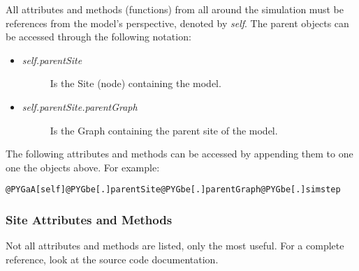 \documentclass[a4paper,10pt]{manual}
\begin{document}
All attributes and methods (functions) from all around the simulation must be references from the model's  perspective, denoted by \emph{self}. The parent objects can be accessed through the following notation:
\begin{itemize}
\item {} \begin{description}
\item[\emph{self.parentSite}]
Is the Site (node) containing the model.

\end{description}

\item {} \begin{description}
\item[\emph{self.parentSite.parentGraph}]
Is the Graph containing the parent site of the model.

\end{description}

\end{itemize}

The following attributes and methods can be accessed by appending them to one one the objects above. For example:

\begin{Verbatim}[commandchars=@\[\]]
@PYGaA[self]@PYGbe[.]parentSite@PYGbe[.]parentGraph@PYGbe[.]simstep
\end{Verbatim}


\subsubsection{Site Attributes and Methods}

Not all attributes and methods are listed, only the most useful. For a complete reference, look at the source code documentation.
\end{document}
